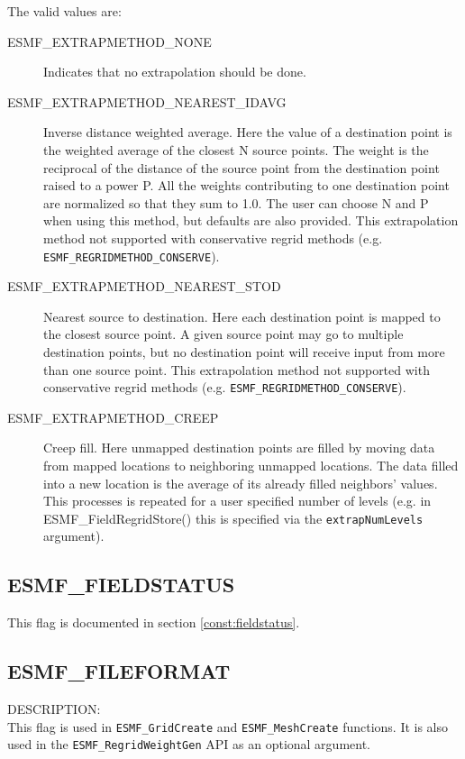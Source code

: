 The valid values are:
\begin{description}
\item [ESMF\_EXTRAPMETHOD\_NONE]
     Indicates that no extrapolation should be done. 
\item [ESMF\_EXTRAPMETHOD\_NEAREST\_IDAVG]
      Inverse distance weighted average. 
      Here the value of a destination point is the weighted average
      of the closest N source points. The weight is 
      the reciprocal of the distance of the source point from the destination point raised to a power P.
      All the weights contributing to one destination point are normalized so that they sum to 1.0. 
      The user can choose N and P when using this method, but defaults are also provided.  
      This extrapolation method not supported with conservative regrid methods 
      (e.g. {\tt ESMF\_REGRIDMETHOD\_CONSERVE}).
\item [ESMF\_EXTRAPMETHOD\_NEAREST\_STOD]
      Nearest source to destination. 
      Here each destination point is mapped to the closest source point. A given source point may go 
      to multiple destination points, but no destination point will receive input from more than
      one source point. This extrapolation method not supported with conservative regrid methods
      (e.g. {\tt ESMF\_REGRIDMETHOD\_CONSERVE}).
\item [ESMF\_EXTRAPMETHOD\_CREEP]
      Creep fill.
      Here unmapped destination points are filled by moving data from mapped locations to neighboring unmapped locations. The data filled into a new location is the average of its already filled neighbors' values. This processes is repeated for a user specified number of levels (e.g. in ESMF\_FieldRegridStore() this is specified via the {\tt extrapNumLevels} argument).

\end{description}

\subsection{ESMF\_FIELDSTATUS}
This flag is documented in section \ref{const:fieldstatus}.

\subsection{ESMF\_FILEFORMAT}
\label{const:fileformatflag}
{\sf DESCRIPTION:\\}
This flag is used in {\tt ESMF\_GridCreate} and {\tt ESMF\_MeshCreate}
functions.  It is also used in the {\tt ESMF\_RegridWeightGen} API as an
optional argument.

